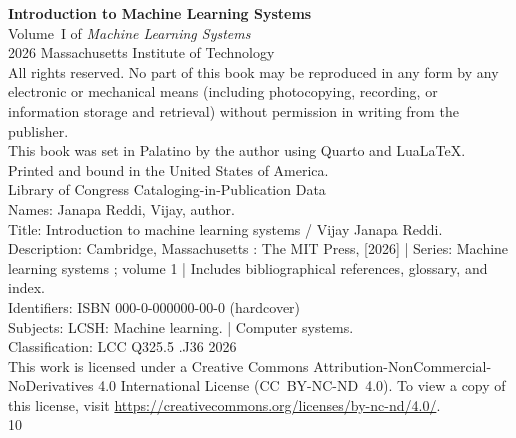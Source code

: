 \null\vfill
\begin{flushleft}
\thispagestyle{empty}

{\large\bfseries Introduction to Machine Learning Systems}\\[0.5em]
{\normalsize Volume~I of \textit{Machine Learning Systems}}\\[1.5em]

\textcopyright{} 2026 Massachusetts Institute of Technology\\[0.5em]

All rights reserved. No part of this book may be reproduced in any form by any electronic or mechanical means (including photocopying, recording, or information storage and retrieval) without permission in writing from the publisher.\\[1em]

This book was set in Palatino by the author using Quarto and Lua\LaTeX.\\[0.5em]

Printed and bound in the United States of America.\\[1em]

Library of Congress Cataloging-in-Publication Data\\[0.25em]
Names: Janapa Reddi, Vijay, author.\\
Title: Introduction to machine learning systems / Vijay Janapa Reddi.\\
Description: Cambridge, Massachusetts : The MIT Press, [2026] | Series: Machine learning systems ; volume 1 | Includes bibliographical references, glossary, and index.\\
Identifiers: ISBN 000-0-000000-00-0 (hardcover)\\
Subjects: LCSH: Machine learning. | Computer systems.\\
Classification: LCC Q325.5 .J36 2026\\[1em]

This work is licensed under a Creative Commons Attribution-NonCommercial-NoDerivatives 4.0 International License (CC~BY-NC-ND~4.0). To view a copy of this license, visit \url{https://creativecommons.org/licenses/by-nc-nd/4.0/}.\\[1em]

10

\end{flushleft}
